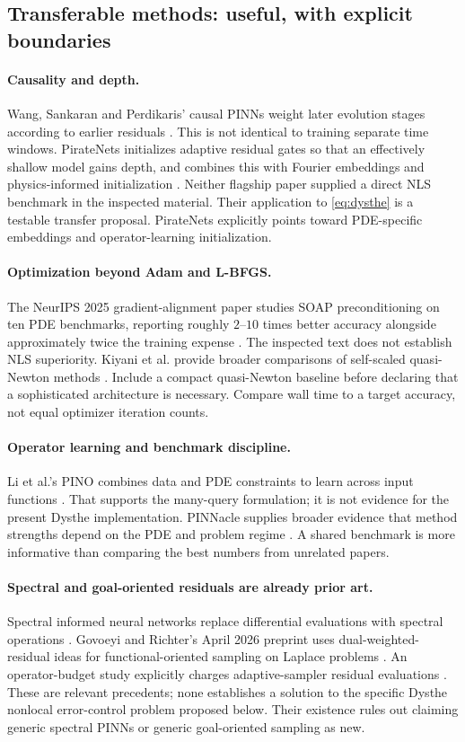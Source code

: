 \subsection{Transferable methods: useful, with explicit boundaries}
\paragraph{Causality and depth.}
Wang, Sankaran and Perdikaris' causal PINNs weight later evolution stages
according to earlier residuals \cite{causal}. This is not identical to
training separate time windows. PirateNets initializes adaptive residual
gates so that an effectively shallow model gains depth, and combines this
with Fourier embeddings and physics-informed initialization
\cite{pirate}. Neither flagship paper supplied a direct NLS benchmark in
the inspected material. Their application to \eqref{eq:dysthe} is a
testable transfer proposal. PirateNets explicitly points toward
PDE-specific embeddings and operator-learning initialization.

\paragraph{Optimization beyond Adam and L-BFGS.}
The NeurIPS 2025 gradient-alignment paper studies SOAP preconditioning on
ten PDE benchmarks, reporting roughly $2$--$10$ times better accuracy
alongside approximately twice the training expense \cite{soap}.
The inspected text does not establish NLS superiority. Kiyani et al.
provide broader comparisons of self-scaled quasi-Newton methods
\cite{optimizer}. Include a compact quasi-Newton baseline before declaring
that a sophisticated architecture is necessary. Compare wall time to a
target accuracy, not equal optimizer iteration counts.

\paragraph{Operator learning and benchmark discipline.}
Li et al.'s PINO combines data and PDE constraints to learn across input
functions \cite{pino}. That supports the many-query formulation; it is not
evidence for the present Dysthe implementation. PINNacle supplies broader
evidence that method strengths depend on the PDE and problem regime
\cite{pinnacle}. A shared benchmark is more informative than comparing the
best numbers from unrelated papers.

\paragraph{Spectral and goal-oriented residuals are already prior art.}
Spectral informed neural networks replace differential evaluations with
spectral operations \cite{spectral}. Govoeyi and Richter's April 2026
preprint uses dual-weighted-residual ideas for functional-oriented sampling
on Laplace problems \cite{goal}. An operator-budget study explicitly
charges adaptive-sampler residual evaluations \cite{operatorbudget}.
These are relevant precedents; none establishes a solution to the specific
Dysthe nonlocal error-control problem proposed below. Their existence
rules out claiming generic spectral PINNs or generic goal-oriented
sampling as new.


